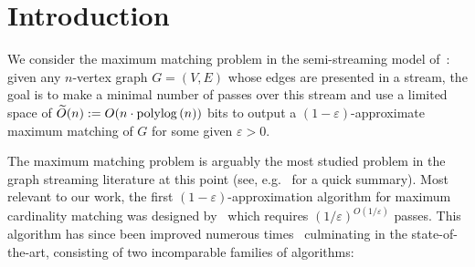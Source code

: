 \documentclass{article}
\newcommand{\Ot}{\widetilde{O}}
\newcommand{\eps}{\varepsilon}
\newcommand{\poly}{\mbox{\rm poly}}
\begin{document}







\section{Introduction}\label{sec:intro}

We consider the maximum matching problem in the semi-streaming model of~\cite{FeigenbaumKMSZ05}: given any $n$-vertex graph $G=(V,E)$ whose edges are presented in a stream, the goal is to make a minimal number of passes
over this stream and use a limited space of $\Ot(n):= O(n \cdot \poly\!\log{(n)})$ bits to output a $(1-\eps)$-approximate maximum matching of $G$ for some given $\eps > 0$. 

The maximum matching problem is arguably the most studied problem in the graph streaming literature at this point (see, e.g.~\cite{AssadiS23} for a quick summary). 
Most relevant to our work, the first $(1-\eps)$-approximation algorithm for maximum cardinality matching
was designed by~\cite{McGregor05} which requires $(1/\eps)^{O(1/\eps)}$ passes. 
This algorithm has since been improved numerous times~\cite{EggertKS09,AhnG11,AhnG11b,EggertKMS12,Kapralov13,AhnG15,BehnezhadDETY17,Tirodkar18,GamlathKMS19,AssadiLT21,FischerMU22,AssadiJJST22,HuangS23} culminating in the state-of-the-art, consisting of two incomparable families of algorithms:  
\end{document}
